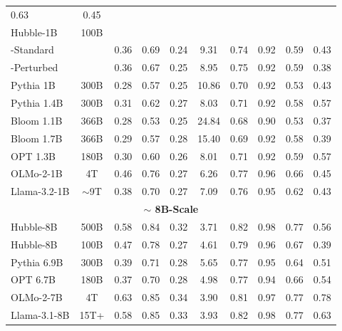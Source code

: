 \documentclass{article} %
\begin{document}
\begin{table}[h]
\begin{tabular}{lccccccccc}
  {0.63} &
  {0.45} \\
{Hubble-1B} & {100B} & & & & & & & & \\
{-Standard} &
  &
  {0.36} &
  {0.69} &
  {0.24} &
  {9.31} &
  {0.74} &
  {0.92} &
  {0.59} &
  {0.43} \\
{-Perturbed} &
  &
  {0.36} &
  {0.67} &
  {0.25} &
  {8.95} &
  {0.75} &
  {0.92} &
  {0.59} &
  {0.38} \\
{Pythia 1B} &
  {300B} &
  {0.28} &
  {0.57} &
  {0.25} &
  {10.86} &
  {0.70} &
  {0.92} &
  {0.53} &
  {0.43} \\
{Pythia 1.4B} &
  {300B} &
  {0.31} &
  {0.62} &
  {0.27} &
  {8.03} &
  {0.71} &
  {0.92} &
  {0.58} &
  {0.57} \\
{Bloom 1.1B} &
  {366B} &
  {0.28} &
  {0.53} &
  {0.25} &
  {24.84} &
  {0.68} &
  {0.90} &
  {0.53} &
  {0.37} \\
{Bloom 1.7B} &
  {366B} &
  {0.29} &
  {0.57} &
  {0.28} &
  {15.40} &
  {0.69} &
  {0.92} &
  {0.58} &
  {0.39} \\
{OPT 1.3B} &
  {180B} &
  {0.30} &
  {0.60} &
  {0.26} &
  {8.01} &
  {0.71} &
  {0.92} &
  {0.59} &
  {0.57} \\
{OLMo-2-1B} &
  {4T} &
  {0.46} &
  {0.76} &
  {0.27} &
  {6.26} &
  {0.77} &
  {0.96} &
  {0.66} &
  {0.45} \\
{Llama-3.2-1B} &
  {$\sim$9T} &
  {0.38} &
  {0.70} &
  {0.27} &
  {7.09} &
  {0.76} &
  {0.95} &
  {0.62} &
  {0.43} \\  

\midrule
\multicolumn{10}{c}{{\textbf{$\sim$ 8B-Scale}}} \\ \midrule
{Hubble-8B} & %
  {500B} &
  {0.58} &
  {0.84} &
  {0.32} &
  {3.71} &
  {0.82} &
  {0.98} &
  {0.77} &
  {0.56} \\
{Hubble-8B} & %
  {100B} &
  {0.47} &
  {0.78} &
  {0.27} &
  {4.61} &
  {0.79} &
  {0.96} &
  {0.67} &
  {0.39} \\
{Pythia 6.9B} &
  {300B} &
  {0.39} &
  {0.71} &
  {0.28} &
  {5.65} &
  {0.77} &
  {0.95} &
  {0.64} &
  {0.51} \\
{OPT 6.7B} &
  {180B} &
  {0.37} &
  {0.70} &
  {0.28} &
  {4.98} &
  {0.77} &
  {0.94} &
  {0.66} &
  {0.54} \\
{OLMo-2-7B} &
  {4T} &
  {0.63} &
  {0.85} &
  {0.34} &
  {3.90} &
  {0.81} &
  {0.97} &
  {0.77} &
  {0.78}  \\
{Llama-3.1-8B} &
  {15T+} &
  {0.58} &
  {0.85} &
  {0.33} &
  {3.93} &
  {0.82} &
  {0.98} &
  {0.77} &
  {0.63} \\
\bottomrule
\end{tabular}
\end{table}
\end{document}
